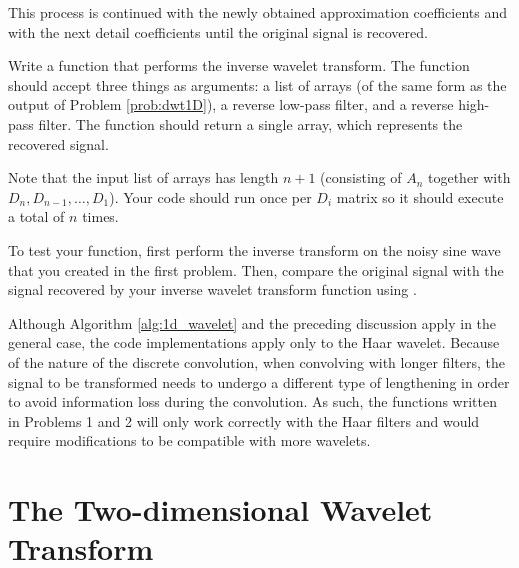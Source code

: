 This process is continued with the newly obtained approximation coefficients and with the next detail coefficients until the original signal is recovered.

\begin{problem} %
Write a function that performs the inverse wavelet transform.
The function should accept three things as arguments: a list of arrays (of the same form as the output of Problem \ref{prob:dwt1D}), a reverse low-pass filter, and a reverse high-pass filter.
The function should return a single array, which represents the recovered signal.

Note that the input list of arrays has length $n+1$ (consisting of $A_n$ together with $D_n, D_{n-1}, \ldots, D_1$). Your code should run once per $D_i$ matrix so it should execute a total of $n$ times.

To test your function, first perform the inverse transform on the noisy sine wave that you created in the first problem.
Then, compare the original signal with the signal recovered by your inverse wavelet transform function using .
\end{problem}

\begin{warn}
Although Algorithm \ref{alg:1d_wavelet} and the preceding discussion apply in the general case, the code implementations apply only to the Haar wavelet.
Because of the nature of the discrete convolution, when convolving with longer filters, the signal to be transformed needs to undergo a different type of lengthening in order to avoid
information loss during the convolution.
As such, the functions written in Problems 1 and 2 will only work correctly with the Haar filters and would require modifications to be compatible with more wavelets.
\end{warn}



\section*{The Two-dimensional Wavelet Transform} %

